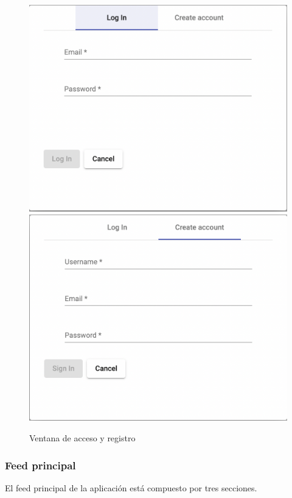 \begin{figure}[H]
    \centering	
        \includegraphics[scale=0.25]{img/login.png}
        \includegraphics[scale=0.25]{img/signin.png}
    \caption{ Ventana de acceso y registro }\label{fig:login}
\end{figure}

\subsubsection{Feed principal}
El feed principal de la aplicación está compuesto por tres secciones.\\


